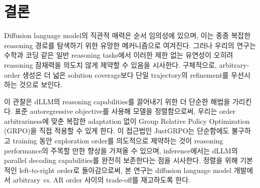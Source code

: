 \section{결론}
\label{sec:conclusion}
Diffusion language model의 직관적 매력은 순서 임의성에 있으며, 이는 종종 복잡한 reasoning 경로를 탐색하기 위한 유망한 메커니즘으로 여겨진다. 그러나 우리의 연구는 수학과 코딩 같은 일반 reasoning tasks에서 이러한 제한 없는 유연성이 오히려 reasoning 잠재력을 의도치 않게 제약할 수 있음을 시사한다.
구체적으로, arbitrary-order 생성은 더 넓은 solution coverage보다 단일 trajectory의 refinement를 우선시하는 것으로 보인다.

이 관찰은 dLLM의 reasoning capabilities를 끌어내기 위한 더 단순한 해법을 가리킨다. 표준 autoregressive objective를 사용해 모델을 정렬함으로써, 우리는 order arbitrariness에 맞춘 복잡한 adaptation 없이 Group Relative Policy Optimization (GRPO)을 직접 적용할 수 있게 한다. 이 접근법인 JustGRPO는 단순함에도 불구하고 training 동안 exploration order를 의도적으로 제약하는 것이 reasoning performance의 주목할 만한 향상을 가져올 수 있으며, inference에서는 dLLM의 parallel decoding capabilities를 완전히 보존한다는 점을 시사한다. 정렬을 위해 기본적인 left-to-right order로 돌아감으로써, 본 연구는 diffusion language model 개발에서 arbitrary \emph{vs.} AR order 사이의 trade-off를 재고하도록 한다.
